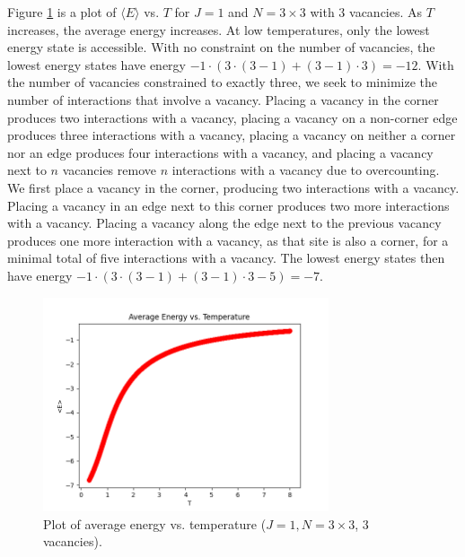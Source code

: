 \documentclass{article}
\begin{document}
\clearpage

\problem
Figure \ref{fig:fig2} is a plot of $\langle E \rangle$ vs. $T$ for $J = 1$ and $N = 3 \times 3$ with $3$ vacancies. As $T$ increases, the average energy increases. At low temperatures, only the lowest energy state is accessible. With no constraint on the number of vacancies, the lowest energy states have energy $-1 \cdot \left(3 \cdot \left(3 - 1\right) + \left(3 - 1\right) \cdot 3\right) = -12$. With the number of vacancies constrained to exactly three, we seek to minimize the number of interactions that involve a vacancy. Placing a vacancy in the corner produces two interactions with a vacancy, placing a vacancy on a non-corner edge produces three interactions with a vacancy, placing a vacancy on neither a corner nor an edge produces four interactions with a vacancy, and placing a vacancy next to $n$ vacancies remove $n$ interactions with a vacancy due to overcounting. We first place a vacancy in the corner, producing two interactions with a vacancy. Placing a vacancy in an edge next to this corner produces two more interactions with a vacancy. Placing a vacancy along the edge next to the previous vacancy produces one more interaction with a vacancy, as that site is also a corner, for a minimal total of five interactions with a vacancy. The lowest energy states then have energy $-1 \cdot \left(3 \cdot \left(3 - 1\right) + \left(3 - 1\right) \cdot 3 - 5\right) = -7$.
\begin{figure}[!htb]
    \centering
    \includegraphics[width=0.75\textwidth]{../code/phy112l_lab5/5-4.png}
    \caption{Plot of average energy vs. temperature ($J = 1, N = 3 \times 3$, $3$ vacancies).}
    \label{fig:fig2}
\end{figure}

\clearpage
\end{document}
